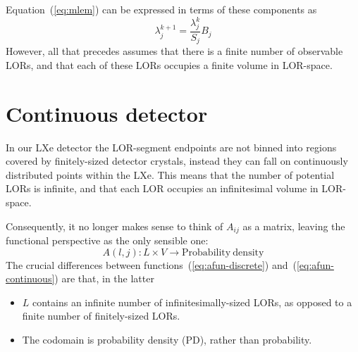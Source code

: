 \documentclass[10pt, a4paper, twocolumn]{article} %
\begin{document}
Equation~(\ref{eq:mlem}) can be expressed in terms of these components as
\begin{equation}
  \label{eq:mlem-components}
  \lambda_{j}^{k+1} = \frac{\lambda_{j}^{{k}}}{S_{j}} B_{j}
\end{equation}
However, all that precedes assumes that there is a finite number of observable
LORs, and that each of these LORs occupies a finite volume in LOR-space.


\section{Continuous detector}
In our LXe detector the LOR-segment endpoints are not binned into regions
covered by finitely-sized detector crystals, instead they can fall on
continuously distributed points within the LXe. This means that the number of
potential LORs is infinite, and that each LOR occupies an infinitesimal volume
in LOR-space.

Consequently, it no longer makes sense to think of \(A_{ij}\) as a matrix, leaving the functional perspective as the only sensible one:
\begin{equation}
  \label{eq:afun-continuous}
  A(l,j): L\times V\rightarrow \mathrm{Probability\ density}
\end{equation}
The crucial differences between functions~(\ref{eq:afun-discrete}) and~(\ref{eq:afun-continuous}) are
that, in the latter
\begin{itemize}
  \item \(L\) contains an infinite number of infinitesimally-sized LORs, as opposed to a finite number of finitely-sized LORs.
  \item The codomain is probability \textrm{density} (PD), rather than
    probability.
\end{itemize}
\end{document}
